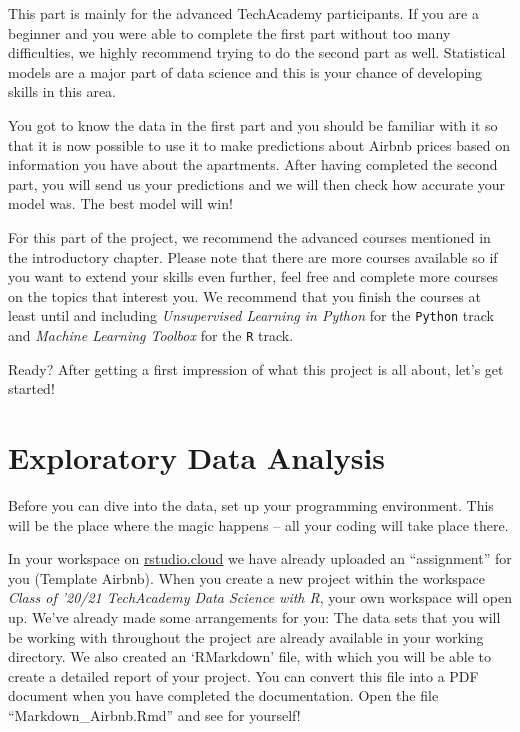 \documentclass[
  11pt,
]{book}
\newenvironment{tips}[1]
  {
  \begin{itemize}
  \footnotesize
  \renewcommand{\labelitemi}{
    \raisebox{-.7\height}[0pt][0pt]{
      {\setkeys{Gin}{width=3em,keepaspectratio}
        \texttt{[image: images/\#1.png]}}
    }
  }
  \setlength{\fboxsep}{1em}
  \begin{rbox}
  \item
  }
  {
  \end{rbox}
  \end{itemize}
  }
\begin{document}
This part is mainly for the advanced TechAcademy participants. If you are a beginner and you were able to complete the first part without too many difficulties, we highly recommend trying to do the second part as well. Statistical models are a major part of data science and this is your chance of developing skills in this area.

You got to know the data in the first part and you should be familiar with it so that it is now possible to use it to make predictions about Airbnb prices based on information you have about the apartments. After having completed the second part, you will send us your predictions and we will then check how accurate your model was. The best model will win!

For this part of the project, we recommend the advanced courses mentioned in the introductory chapter. Please note that there are more courses available so if you want to extend your skills even further, feel free and complete more courses on the topics that interest you. We recommend that you finish the courses at least until and including \emph{Unsupervised Learning in Python} for the \texttt{Python} track and \emph{Machine Learning Toolbox} for the \texttt{R} track.

Ready? After getting a first impression of what this project is all about, let's get started!

\newpage

\hypertarget{exploratory-data-analysis}{%
\chapter{Exploratory Data Analysis}\label{exploratory-data-analysis}}

Before you can dive into the data, set up your programming environment. This will be the place where the magic happens -- all your coding will take place there.

\begin{tips}r

In your workspace on \href{https://rstudio.cloud/projects}{rstudio.cloud} we have already uploaded an ``assignment'' for you (Template Airbnb). When you create a new project within the workspace \emph{Class of '20/21 \textbar{} TechAcademy \textbar{} Data Science with R}, your own workspace will open up. We've already made some arrangements for you: The data sets that you will be working with throughout the project are already available in your working directory. We also created an `RMarkdown' file, with which you will be able to create a detailed report of your project. You can convert this file into a PDF document when you have completed the documentation. Open the file ``Markdown\_Airbnb.Rmd'' and see for yourself!

\end{tips}
\end{document}

